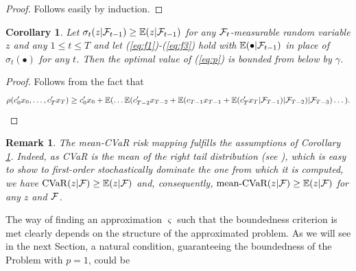 \documentclass{article}              %
\newtheorem{remark}{Remark}
\newtheorem{corollary}{Corollary}
\begin{document}
\begin{proof} Follows easily by induction.
\end{proof}

\begin{corollary}\label{cor:feas}
Let $\sigma_{t}(z|\mathcal{F}_{t-1})\geq \mathbb{E}(z|\mathcal{F}_{t-1})$ for any $\mathcal{F}_t$-measurable random variable $z$ and any $1\leq t\leq T$ and 
let (\ref{eq:f1})-(\ref{eq:f3}) hold with $\mathbb{E}(\bullet|\mathcal{F}_{t-1})$ in place of $\sigma_t(\bullet)$ for any $t$. Then the optimal value of (\ref{eq:p}) is bounded from below by $\gamma$.
\end{corollary}

\begin{proof}Follows from the fact that
$$
\rho(c'_{0}x_{0},\dots,c'_{T}x_{T})
\geq c'_{0}x_{0}+\mathbb{E}(\dots\mathbb{E}(c'_{T-2}x_{T-2}+\mathbb{E}(c_{T-1}x_{T-1}+\mathbb{E}(c'_{T}x_{T}|\mathcal{F}_{T-1})|\mathcal{F}_{T-2})|\mathcal{F}_{T-3})\dots).
$$
\end{proof}


\begin{remark} The mean-CVaR risk mapping fulfills the assumptions of Corollary \ref{cor:feas}. Indeed, as CVaR is the mean of the right tail distribution (see \cite{rockafellar2002conditional}), which is easy
to show to first-order stochastically dominate the one from which
it is computed, we have $\mathrm{CVaR}(z|\mathcal{F}) \geq \mathbb{E}(z|\mathcal{F})$ and, consequently,  $\text{mean-CVaR}(z|\mathcal{F})\geq\mathbb{E}(z|\mathcal{F})$ for any $z$ and $\mathcal{F}$.
\end{remark}

\noindent The way of finding an approximation $\varsigma$ such that the boundedness
criterion is met clearly depends on the structure of the approximated problem.
As we will see in the next Section, a natural condition, guaranteeing
the boundedness of the Problem with $p=1$, could be
\end{document}
